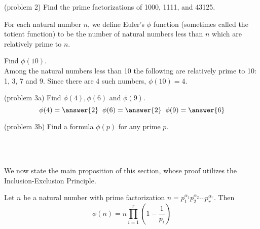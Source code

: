 \documentclass[handout]{ximera}
\begin{document}
\begin{problem}(problem 2)
Find the prime factorizations of 1000, 1111, and 43125.
\end{problem}



\begin{definition}
For each natural number $n$, we define Euler's $\phi$ function (sometimes called the totient function) to be the 
number of natural numbers less than $n$ which are relatively prime to $n$.
\end{definition}


\begin{example}[example 3]
Find $\phi(10)$.\\
Among the natural numbers less than 10 the following are relatively prime to 10: 1, 3, 7 and 9.
Since there are 4 such numbers, $\phi(10) = 4$.
\end{example}

\begin{problem}(problem 3a)
Find $\phi(4), \phi(6)$ and $\phi(9)$.\\
\[
\phi(4) = \answer{2} \;\; \phi(6) = \answer{2} \;\;\phi(9) = \answer{6}
\]
\end{problem}

\begin{problem}(problem 3b)
Find a formula $\phi(p)$ for any prime $p$.\\
\begin{multipleChoice}
\\
\\
\end{multipleChoice}
\end{problem}


We now state the main proposition of this section, whose proof utilizes the Inclusion-Exclusion Principle.





\begin{proposition}
Let $n$ be a natural number with prime factorization
$n = p_1^{\alpha_1}p_2^{\alpha_2} \cdots p_r^{\alpha_r}$.  Then
\[
\phi(n) = n \prod_{i = 1}^r \left(1 - \frac{1}{p_i}\right)
\]
\end{proposition}
\end{document}
